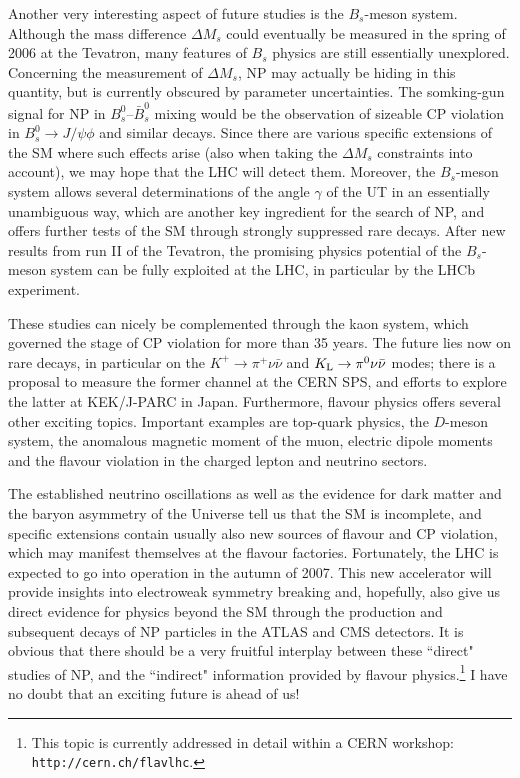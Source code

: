 \documentclass[12pt]{article}
\begin{document}
Another very interesting aspect of future studies is the $B_s$-meson system.
Although the mass difference $\Delta M_s$ could eventually be measured
in the spring of 2006 at the Tevatron, many features of $B_s$ physics
are still essentially unexplored. Concerning the measurement of $\Delta M_s$,
NP may actually be hiding in this quantity, but is currently obscured by parameter
uncertainties. The somking-gun signal for NP in $B^0_s$--$\bar B^0_s$
mixing would be the observation of sizeable CP violation in $B^0_s\to J/\psi \phi$
and similar decays. Since there are various specific extensions of the
SM where such effects arise (also when taking the $\Delta M_s$ constraints into
account), we may hope that the LHC will detect them. Moreover, the $B_s$-meson
system allows several determinations of the angle $\gamma$ of the UT in an 
essentially unambiguous way, which are another key ingredient for the search
of NP, and offers further tests of the SM through strongly suppressed rare decays. 
After new results from run II of the Tevatron, the promising physics potential of
the $B_s$-meson system can be fully exploited at the LHC, in particular by 
the LHCb experiment. 

These studies can nicely be complemented through the kaon system, which 
governed the stage of CP violation for more than 35 years. The future lies now 
on rare decays, in particular on the $K^+\to\pi^+\nu\bar\nu$ and
$K_{\rm L}\to\pi^0\nu\bar\nu$ modes; there is a proposal to measure 
the former channel at the CERN SPS, and efforts to explore the latter 
at KEK/J-PARC in Japan. Furthermore, flavour physics offers several other
exciting topics. Important examples are top-quark physics, the $D$-meson 
system, the anomalous magnetic moment of the muon, electric dipole moments
and the flavour violation in the charged lepton and neutrino sectors. 

The established neutrino oscillations as well as the evidence for dark matter and the baryon asymmetry of the Universe tell us that the SM is incomplete, and specific 
extensions contain usually also new sources of flavour and CP violation, which 
may manifest themselves at the flavour factories. Fortunately, the LHC is expected 
to go into operation in the autumn of 2007. This new accelerator will provide 
insights  into electroweak symmetry breaking and, hopefully, also give us direct 
evidence for physics beyond the SM through the production and subsequent 
decays of NP particles in the ATLAS and CMS detectors. It is obvious that there 
should be a very fruitful interplay between these ``direct" studies of NP, and the 
``indirect" information provided by flavour physics.\footnote{This topic is currently 
addressed in detail within a CERN workshop: {\tt http://cern.ch/flavlhc}.}
I have no doubt that an exciting future is ahead of us!
\end{document}
